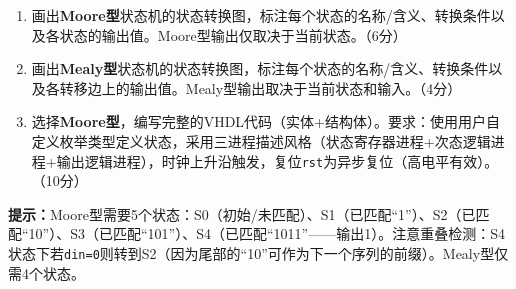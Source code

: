 \begin{enumerate}[label=(\arabic*)]
  \item 画出\textbf{Moore型}状态机的状态转换图，标注每个状态的名称/含义、转换条件以及各状态的输出值。Moore型输出仅取决于当前状态。（6分）
  \item 画出\textbf{Mealy型}状态机的状态转换图，标注每个状态的名称/含义、转换条件以及各转移边上的输出值。Mealy型输出取决于当前状态和输入。（4分）
  \item 选择\textbf{Moore型}，编写完整的VHDL代码（实体+结构体）。要求：使用用户自定义枚举类型定义状态，采用三进程描述风格（状态寄存器进程+次态逻辑进程+输出逻辑进程），时钟上升沿触发，复位\texttt{rst}为异步复位（高电平有效）。（10分）
\end{enumerate}

\begin{framed}
\textbf{提示：}Moore型需要5个状态：S0（初始/未匹配）、S1（已匹配``1''）、S2（已匹配``10''）、S3（已匹配``101''）、S4（已匹配``1011''——输出1）。注意重叠检测：S4状态下若\texttt{din=0}则转到S2（因为尾部的``10''可作为下一个序列的前缀）。Mealy型仅需4个状态。
\end{framed}

\endinput
